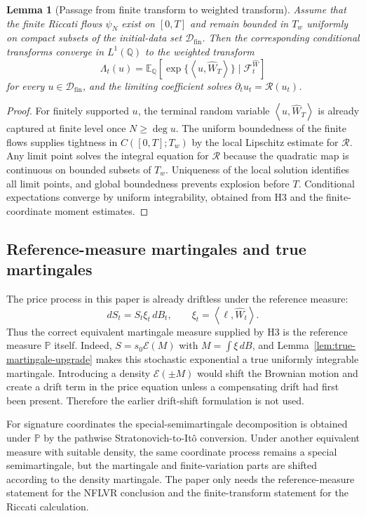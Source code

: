 \documentclass[11pt,oneside]{article}
\theoremstyle{plain}
\newtheorem{lemma}[theorem]{Lemma}
\theoremstyle{definition}
\theoremstyle{remark}
\newcommand{\E}{\mathbb{E}}
\newcommand{\Q}{\mathbb{Q}}
\newcommand{\Pp}{\mathbb{P}}
\newcommand{\Tw}{T_w}
\newcommand{\cW}{\widehat W}
\newcommand{\FWh}{\mathcal F^{\widehat W}}
\newcommand{\Rs}{\mathcal R}
\newcommand{\inner}[2]{\left\langle #1,#2\right\rangle}
\begin{document}
\begin{lemma}[Passage from finite transform to weighted transform]
\label{lem:finite-to-weighted-transform}
Assume that the finite Riccati flows $\psi_N$ exist on $[0,T]$ and remain bounded in $\Tw$ uniformly on compact subsets of the initial-data set $\mathcal D_{\mathrm{fin}}$. Then the corresponding conditional transforms converge in $L^1(\Q)$ to the weighted transform
\[
\Lambda_t(u)=\E_\Q\left[\exp\{\inner{u}{\cW_T}\}\mid\FWh_t\right]
\]
for every $u\in\mathcal D_{\mathrm{fin}}$, and the limiting coefficient solves $\partial_tu_t=\Rs(u_t)$.
\end{lemma}

\begin{proof}
For finitely supported $u$, the terminal random variable $\inner{u}{\cW_T}$ is already captured at finite level once $N\geq \deg u$. The uniform boundedness of the finite flows supplies tightness in $C([0,T];\Tw)$ by the local Lipschitz estimate for $\Rs$. Any limit point solves the integral equation for $\Rs$ because the quadratic map is continuous on bounded subsets of $\Tw$. Uniqueness of the local solution identifies all limit points, and global boundedness prevents explosion before $T$. Conditional expectations converge by uniform integrability, obtained from H3 and the finite-coordinate moment estimates.
\end{proof}

\subsection{Reference-measure martingales and true martingales}
\label{subsec:measure-change-true-martingales}
The price process in this paper is already driftless under the reference measure:
\[
 dS_t=S_t\xi_t\,dB_t,
 \qquad \xi_t=\inner{\ell}{\cW_t}.
\]
Thus the correct equivalent martingale measure supplied by H3 is the reference measure $\Pp$ itself. Indeed, $S=s_0\mathcal E(M)$ with $M=\int\xi\,dB$, and Lemma~\ref{lem:true-martingale-upgrade} makes this stochastic exponential a true uniformly integrable martingale. Introducing a density $\mathcal E(\pm M)$ would shift the Brownian motion and create a drift term in the price equation unless a compensating drift had first been present. Therefore the earlier drift-shift formulation is not used.

For signature coordinates the special-semimartingale decomposition is obtained under $\Pp$ by the pathwise Stratonovich-to-It\^o conversion. Under another equivalent measure with suitable density, the same coordinate process remains a special semimartingale, but the martingale and finite-variation parts are shifted according to the density martingale. The paper only needs the reference-measure statement for the NFLVR conclusion and the finite-transform statement for the Riccati calculation.
\end{document}
